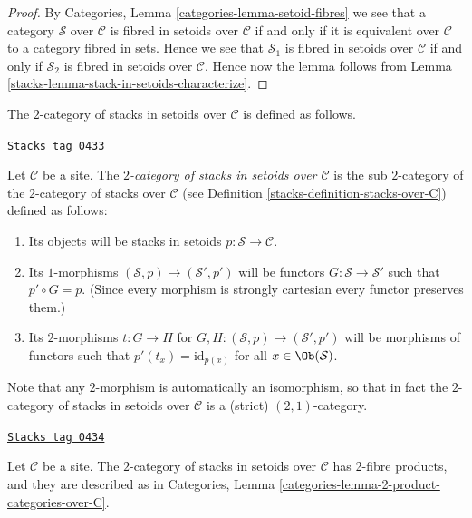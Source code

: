 \begin{proof}

By
Categories, Lemma \ref{categories-lemma-setoid-fibres}
we see that a category $\mathcal{S}$ over $\mathcal{C}$ is fibred in setoids
over $\mathcal{C}$ if and only if it is equivalent over $\mathcal{C}$
to a category fibred in sets.
Hence we see that $\mathcal{S}_1$ is fibred in setoids over $\mathcal{C}$
if and only if $\mathcal{S}_2$ is fibred in setoids over $\mathcal{C}$.
Hence now the lemma follows from
Lemma \ref{stacks-lemma-stack-in-setoids-characterize}.
\end{proof}

The $2$-category of stacks in setoids over $\mathcal{C}$
is defined as follows.

\begin{definition}
\label{stacks-definition-stacks-in-setoids-over-C}
\href{https://stacks.math.columbia.edu/tag/0433}{\texttt{Stacks tag 0433}}

Let $\mathcal{C}$ be a site.
The {\it $2$-category of stacks in setoids over $\mathcal{C}$}
is the sub $2$-category of the $2$-category of stacks
over $\mathcal{C}$ (see Definition \ref{stacks-definition-stacks-over-C})
defined as follows:
\begin{enumerate}
\item Its objects will be stacks in setoids
$p : \mathcal{S} \to \mathcal{C}$.
\item Its $1$-morphisms $(\mathcal{S}, p) \to (\mathcal{S}', p')$
will be functors $G : \mathcal{S} \to \mathcal{S}'$ such that
$p' \circ G = p$. (Since every morphism is strongly cartesian
every functor preserves them.)
\item Its $2$-morphisms $t : G \to H$ for
$G, H : (\mathcal{S}, p) \to (\mathcal{S}', p')$
will be morphisms of functors
such that $p'(t_x) = \text{id}_{p(x)}$
for all $x \in \Ob(\mathcal{S})$.
\end{enumerate}
\end{definition}

Note that any $2$-morphism is automatically an isomorphism, so
that in fact the $2$-category of stacks in setoids over $\mathcal{C}$
is a (strict) $(2, 1)$-category.

\begin{lemma}
\label{stacks-lemma-2-product-stacks-in-setoids}
\href{https://stacks.math.columbia.edu/tag/0434}{\texttt{Stacks tag 0434}}

Let $\mathcal{C}$ be a site.
The $2$-category of stacks in setoids over $\mathcal{C}$
has 2-fibre products, and they are described as in
Categories, Lemma \ref{categories-lemma-2-product-categories-over-C}.
\end{lemma}

